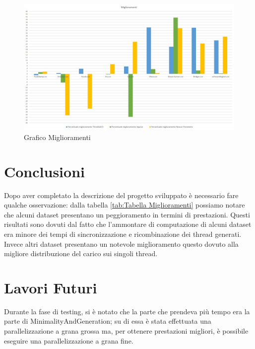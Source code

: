 \begin{figure}[H]
	\centering
	\includegraphics[scale=0.43]{Immagini/GraficoMiglioramenti.jpg}
	\caption{Grafico Miglioramenti}
	\label{fig:Grafico Miglioramenti}
\end{figure}

\section{Conclusioni}
Dopo aver completato la descrizione del progetto sviluppato è necessario fare qualche osservazione:  dalla tabella \ref{tab:Tabella Miglioramenti} possiamo notare che alcuni dataset presentano un peggioramento in termini di prestazioni. Questi risultati sono dovuti dal fatto che l'ammontare di computazione di alcuni dataset era minore dei tempi di sincronizzazione e ricombinazione dei thread generati. Invece altri dataset presentano un notevole miglioramento questo dovuto alla migliore distribuzione del carico sui singoli thread. 
\section{Lavori Futuri}
Durante la fase di testing, si è notato che la parte che prendeva più tempo era la parte di MinimalityAndGeneration; su di essa è stata effettuata una parallelizzazione a grana grossa ma, per ottenere prestazioni migliori, è possibile eseguire una parallelizzazione a grana fine.
